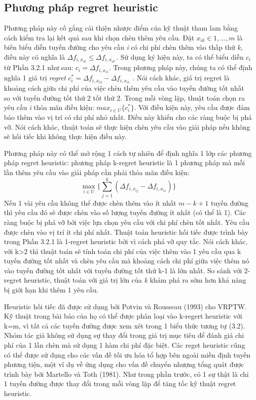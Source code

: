 \subsection{Phương pháp regret heuristic}
Phương pháp này cố gắng cải thiện nhược điểm của kỹ thuật tham lam bằng cách kiểm tra lại kết quả sau khi chọn chèn thêm yêu cầu. Đặt $x_{ik} \in {1, ..., m}$ là biến biểu diễn tuyến đường cho yêu cầu \textit{i} có chi phí chèn thêm vào thấp thứ \textit{k}, điều này có nghĩa là $\Delta f_{i, x_{ik}} \leqslant \Delta f_{i, x_{ik'}}$. Sử dụng ký hiệu này, ta có thể biểu diễn $c_i$ từ Phần 3.2.1 như sau: $c_i = \Delta f_{i, x_{i1}}$. Trong phương pháp này, chúng ta có thể định nghĩa 1 giá trị \textit{regret} $c_i^* = \Delta f_{i, x_{i2}} - \Delta f_{i, x_{i1}}$ . Nói cách khác, giá trị regret là khoảng cách giữa chi phí của việc chèn thêm yêu cầu vào tuyến đường tốt nhất so với tuyến đường tốt thứ 2 tốt thứ 2. Trong mỗi vòng lặp, thuật toán chọn ra yêu cầu \textit{i} thỏa mãn điều kiện: $max_{i \in U} \{c_i^*\}$. Với điều kiện này, yêu cầu được đảm bảo thêm vào vị trí có chi phí nhỏ nhất. Điều này khiến cho các ràng buộc bị phá vỡ. Nói cách khác, thuật toán sẽ thực hiện chèn yêu cầu vào giải pháp nếu không sẽ hối tiếc khi không thực hiện điều này.

Phương pháp này có thể mở rộng 1 cách tự nhiên để định nghĩa 1 lớp các phương pháp regret heuristic: phương pháp k-regret heuristic là 1 phương pháp mà mỗi lần thêm yêu cầu vào giải pháp cần phải thỏa mãn điều kiện:
\begin{equation}
    \max\limits_{i \in U} \{ \sum_{j=1}^k (\Delta f_{i, x_{ij}} - \Delta f_{i, x_{i1}}) \}
\end{equation}
Nếu 1 vài yêu cầu không thể được chèn thêm vào ít nhất $m-k+1$ tuyến đường thì yêu cầu đó sẽ được chèn vào số lượng tuyến đường ít nhất (có thể là 1). Các ràng buộc bị phá vỡ bởi việc lựa chọn yêu cầu với chi phí chèn tốt nhất. Yêu cầu được chèn vào vị trí ít chi phí nhất. Thuật toán heuristic hối tiếc được trình bày trong Phần 3.2.1 là 1-regret heuristic bởi vì cách phá vỡ quy tắc. Nói cách khác, với k>2 thì thuật toán sẽ tính toán chi phí của việc thêm vào 1 yêu cầu qua k tuyến đường tốt nhất và chèn yêu cầu mà khoảng cách chi phí giữa việc thêm nó vào tuyến đường tốt nhất với tuyến đường tốt thứ k-1 là lớn nhất. So sánh với 2-regret heuristic, thuật toán với giá trị lớn của \textit{k} khám phá ra sớm hơn khả năng bị giới hạn khi thêm 1 yêu cầu.

Heuristic hối tiếc đã được sử dụng bởi Potvin và Rousseau (1993) cho VRPTW. Kỹ thuật trong bài báo của họ có thể được phân loại vào k-regert heuristic với k=m, vì tất cả các tuyến đường được xem xét trong 1 biểu thức tương tự (3.2). Nhóm tác giả không sử dụng sự thay đổi trong giá trị mục tiêu để đánh giá chi phí của 1 lần chèn mà sử dụng 1 hàm chi phí đặc biệt. Các reget heuristic cũng có thể được sử dụng cho các vấn đề tối ưu hóa tổ hợp bên ngoài miền định tuyến phương tiện, một ví dụ về ứng dụng cho vấn đề chuyển nhượng tổng quát được trình bày bởi Martello và Toth (1981). Như trong phần trước, có 1 sự thật là chỉ 1 tuyến đường được thay đổi trong mỗi vòng lặp để tăng tốc kỹ thuật regret heuristic.